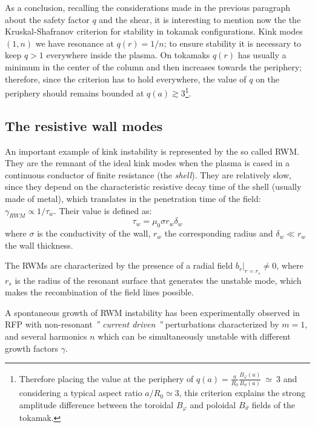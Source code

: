 As a conclusion, recalling the considerations made in the previous paragraph about the safety factor $ q $ and the shear, it is interesting to mention now the the Kruskal-Shafranov criterion for stability in tokamak configurations. Kink modes $(1,n)$ we have resonance at $q(r)=1/n$; to ensure stability it is necessary to keep $q>1$ everywhere inside the plasma. On tokamaks $ q (r) $ has usually a minimum in the center of the column and then increases towards the periphery; therefore, since the criterion has to hold everywhere, the value of $q$ on the periphery should remains bounded at $ q(a) \gtrsim 3 $\footnote{Therefore placing the value at the periphery of $q(a)=\frac{a}{R_0}\frac{B_\varphi(a)}{B_\vartheta(a)}~\simeq~3$ and considering a typical aspect ratio $a/R_0 \simeq 3$, this criterion explains the strong amplitude difference between the toroidal $B_\varphi$ and poloidal $B_\vartheta$ fields of the tokamak.}.


\subsection{The resistive wall modes}

An important example of kink instability is represented by the so called \ac{RWM}. They are the remnant of the ideal kink modes when the plasma is cased in a continuous conductor of finite resistance (the \emph{shell}). They are relatively slow, since they depend on the characteristic resistive decay time of the shell (usually made of metal), which translates in the penetration time of the field: $\gamma_{RWM} \propto 1/\tau_w$. Their value is defined as:
%
\begin{equation}
 \tau_w = \mu_0 \sigma r_w \delta_w
\end{equation}
%
where $\sigma$ is the conductivity of the wall, $ r_w $ the corresponding radius and $\delta_w \ll r_w$ the wall thickness. 

The \acs{RWM}s are characterized by the presence of a radial field $b_r|_{r=r_s} \neq 0$, where $ r_s $ is the radius of the resonant surface that generates the unstable mode, which makes the recombination of the field lines possible.

A spontaneous growth of \acs{RWM} instability has been experimentally observed in \acs{RFP} with non-resonant \emph{'' current driven ''} perturbations characterized by $ m = 1 $, and several harmonics $ n $ which can be simultaneously unstable with different growth factors $\gamma$\cite{pizz46}\cite{pizz47}\cite{gregoratto}.

